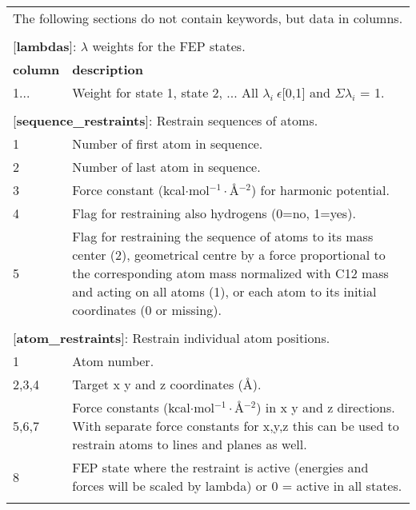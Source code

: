 \documentclass[a4paper,10pt]{article}
\begin{document}
\begin{longtable}{|p{78pt}|p{158pt}|p{158pt}|}
\multicolumn{3}{p{394pt}}{The following sections do not contain keywords, but data in columns.}\\
\multicolumn{3}{p{394pt}}{}\\

\multicolumn{3}{p{394pt}}{[\textbf{lambdas}]: $\lambda$ weights for the FEP states.}\\
\hline \textbf{column} & \multicolumn{2}{p{320pt}|}{\textbf{description}}\\
\hline1... & \multicolumn{2}{p{320pt}|}{Weight for state 1, state 2, ... All $\lambda_i ~ \epsilon$[0,1] and $\Sigma\lambda_i$ = 1.}\\
\hline
\multicolumn{3}{p{394pt}}{}\\

\multicolumn{3}{p{394pt}}{[\textbf{sequence\_restraints}]: Restrain sequences of atoms.}\\
\hline 1 & \multicolumn{2}{p{320pt}|}{Number of first atom in sequence.}\\
\hline 2 & \multicolumn{2}{p{320pt}|}{Number of last atom in sequence.}\\
\hline 3 & \multicolumn{2}{p{320pt}|}{Force constant (kcal$\cdot$mol$^{-1}\cdot$\AA$^{-2}$) for harmonic potential.}\\
\hline 4 & \multicolumn{2}{p{320pt}|}{Flag for restraining also hydrogens (0=no, 1=yes).}\\
\hline 5 & \multicolumn{2}{p{320pt}|}{Flag for restraining the sequence of atoms to its mass center (2), geometrical centre by a force proportional to the corresponding atom mass normalized with C12 mass and acting on all atoms (1), or each atom to its initial coordinates (0 or missing).}\\
\hline
\multicolumn{3}{p{394pt}}{}\\

\multicolumn{3}{p{394pt}}{[\textbf{atom\_restraints}]: Restrain individual atom positions.}\\
\hline 1 & \multicolumn{2}{p{320pt}|}{Atom number.}\\
\hline 2,3,4 & \multicolumn{2}{p{320pt}|}{Target x y and z coordinates (\AA).}\\
\hline 5,6,7 & \multicolumn{2}{p{320pt}|}{Force constants (kcal$\cdot$mol$^{-1}\cdot$\AA$^{-2}$) in x y and z directions. With separate force constants for x,y,z this can be used to restrain atoms to lines and planes as well.}\\
\hline 8 & \multicolumn{2}{p{320pt}|}{FEP state where the restraint is active (energies and forces will be scaled by lambda) or 0 = active in all states.}\\
\hline
\multicolumn{3}{p{394pt}}{}\\


\end{longtable}
\end{document}
